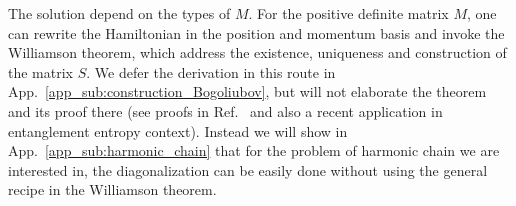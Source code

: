 The solution depend on the types of $M$. For the positive definite matrix $M$, one can rewrite the Hamiltonian in the position and momentum basis and invoke the Williamson theorem\cite{arnold_mathematical_2010}, which address the existence, uniqueness and construction of the matrix $S$. We defer the derivation in this route in App.~\ref{app_sub:construction_Bogoliubov}, but will not elaborate the theorem and its proof there (see proofs in Ref.~ and also a recent application in entanglement entropy context\cite{coser_contour_2017}). Instead we will show in App.~\ref{app_sub:harmonic_chain} that for the problem of harmonic chain we are interested in, the diagonalization can be easily done without using the general recipe in the Williamson theorem. 

